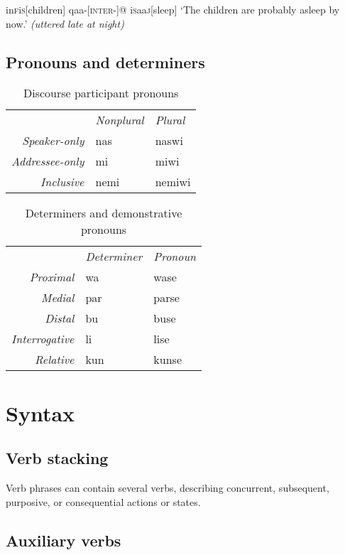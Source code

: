 \documentclass[a4paper,10pt,twoside,openright]{memoir}
\newcommand{\famwordold}[5]{#1\textsc{#2}#3\textsc{#4}#5}
\begin{document}
\ex
\begingl
\famwordold{in}{f}{i}{s}{}[children]
qaa-[\textsc{inter-}]@
\famwordold{i}{s}{aa}{j}{}[sleep]
\glft `The children are probably asleep by now.' \textit{(uttered late at night)}
\endgl
\xe

\newpage
\section{Pronouns and determiners}

\begin{table}[ht]
    \centering
    \begin{tabular}{rll}
        & \textit{Nonplural} & \textit{Plural} \\
    \textit{Speaker-only} & nas & naswi \\
    \textit{Addressee-only} & mi & miwi \\
    \textit{Inclusive} & nemi & nemiwi \\
    \end{tabular}
    \caption{Discourse participant pronouns}
    \label{tab:firstandsecond}
\end{table}

\begin{table}[ht]
    \centering
    \begin{tabular}{>{\em}rll}
        & \textit{Determiner} & \textit{Pronoun}  \\
    Proximal & wa & wase \\
    Medial & par & parse \\
    Distal & bu & buse \\
    Interrogative & li & lise \\
    Relative & kun & kunse 
    \end{tabular}
    \caption{Determiners and demonstrative pronouns}
    \label{tab:determiners}
\end{table}

\chapter{Syntax}

\section{Verb stacking}

Verb phrases can contain several verbs, describing concurrent, subsequent, purposive, or consequential actions or states.

\section{Auxiliary verbs}
\end{document}
